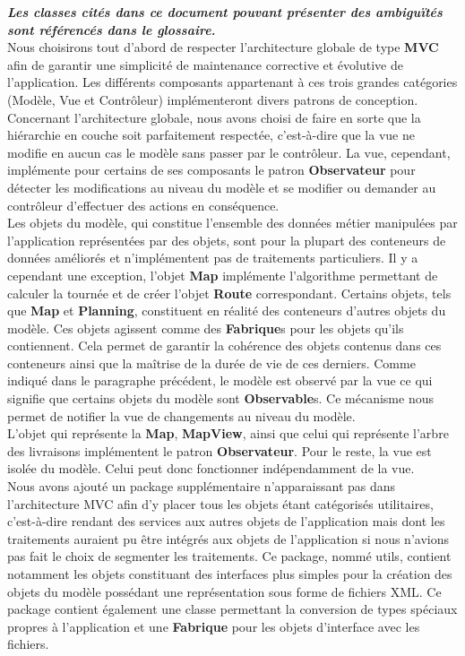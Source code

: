 \documentclass[paper=a4, fontsize=11pt]{report}
\numberwithin{equation}{section}		%
\numberwithin{figure}{section}		%
\numberwithin{table}{section}		%
\renewcommand{\bf}[1]{\textbf{#1}}
\newcommand{\bfit}[1]{\textbf{\textit{#1}}}
\begin{document}
\bfit{Les classes cités dans ce document pouvant présenter des ambiguïtés sont référencés dans le glossaire.} \\

Nous choisirons tout d'abord de respecter l'architecture globale de type \bf{MVC} afin de garantir une simplicité de maintenance corrective et évolutive de l'application. Les différents composants appartenant à ces trois grandes catégories (Modèle, Vue et Contrôleur) implémenteront divers patrons de conception. \\

Concernant l'architecture globale, nous avons choisi de faire en sorte que la hiérarchie en couche soit parfaitement respectée, c'est-à-dire que la vue ne modifie en aucun cas le modèle sans  passer par le contrôleur. La vue, cependant, implémente pour certains de ses composants le patron \bf{Observateur} pour détecter les modifications au niveau du modèle et se modifier ou demander au contrôleur d'effectuer des actions en conséquence.\\

Les objets du modèle, qui constitue l'ensemble des données métier manipulées par l'application représentées par des objets, sont pour la plupart des conteneurs de données améliorés et n'implémentent pas de traitements particuliers. Il y a cependant une exception, l'objet \bf{Map} implémente l'algorithme permettant de calculer la tournée et de créer l'objet \bf{Route} correspondant. Certains objets, tels que \bf{Map} et \bf{Planning}, constituent en réalité des conteneurs d'autres objets du modèle. Ces objets agissent comme des \bf{Fabrique}s pour les objets qu'ils contiennent. Cela permet de garantir la cohérence des objets contenus dans ces conteneurs ainsi que la maîtrise de la durée de vie de ces derniers. Comme indiqué dans le paragraphe précédent, le modèle est observé par la vue ce qui signifie que certains objets du modèle sont \bf{Observable}s. Ce mécanisme nous permet de notifier la vue de changements au niveau du modèle. \\

L'objet qui représente la \bf{Map}, \bf{MapView}, ainsi que celui qui représente l'arbre des livraisons implémentent le patron \bf{Observateur}. Pour le reste, la vue est isolée du modèle. Celui peut donc fonctionner indépendamment de la vue.\\

Nous avons ajouté un package supplémentaire n'apparaissant pas dans l'architecture MVC afin d'y placer tous les objets étant catégorisés utilitaires, c'est-à-dire rendant des services aux autres objets de l'application mais dont les traitements auraient pu être intégrés aux objets de l'application si nous n'avions pas fait le choix de segmenter les traitements. Ce package, nommé utils, contient notamment les objets constituant des interfaces plus simples pour la création des objets du modèle possédant une représentation sous forme de fichiers XML. Ce package contient également une classe permettant la conversion de types spéciaux propres à l'application et une \bf{Fabrique} pour les objets d'interface avec les fichiers. \\
\end{document}
